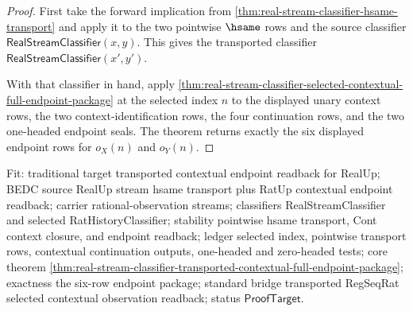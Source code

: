 \begin{proof}
First take the forward implication from
\autoref{thm:real-stream-classifier-hsame-transport} and apply it to the two
pointwise $\hsame$ rows and the source classifier
$\mathsf{RealStreamClassifier}(x,y)$. This gives the transported classifier
$\mathsf{RealStreamClassifier}(x',y')$.

With that classifier in hand, apply
\autoref{thm:real-stream-classifier-selected-contextual-full-endpoint-package}
at the selected index $n$ to the displayed unary context rows, the two
context-identification rows, the four continuation rows, and the two one-headed
endpoint seals. The theorem returns exactly the six displayed endpoint rows for
$o_X(n)$ and $o_Y(n)$.
\end{proof}

Fit: traditional target transported contextual endpoint readback for RealUp;
BEDC source RealUp stream hsame transport plus RatUp contextual endpoint
readback; carrier rational-observation streams; classifiers RealStreamClassifier
and selected RatHistoryClassifier; stability pointwise hsame transport, Cont
context closure, and endpoint readback; ledger selected index, pointwise
transport rows, contextual continuation outputs, one-headed and zero-headed
tests; core theorem
\autoref{thm:real-stream-classifier-transported-contextual-full-endpoint-package};
exactness the six-row endpoint package; standard bridge transported RegSeqRat
selected contextual observation readback; status $\mathsf{ProofTarget}$.

